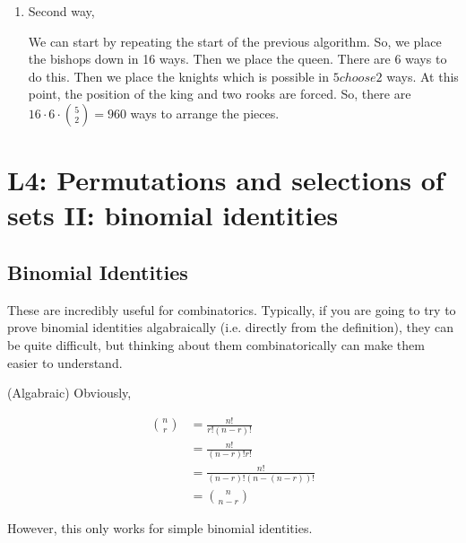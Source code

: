 \documentclass{report}
\begin{document}
{\begin{enumerate}
         All in all, there are $16\cdot (4 + 6 + 6 + 4)\cdot 3 = 960$. Hence,
         why it is called Chess 960. 
        
        \item Second way, 
        
        We can start by repeating the start of the previous algorithm. So,
        we place the bishops down in 16 ways. Then we place the queen. There are 
        6 ways to do this. Then we place the knights which is possible in $5 choose 2$ ways. 
        At this point, the position of the king and two rooks are forced. So, 
        there are $16\cdot 6\cdot \binom{5}{2} = 960$ ways to arrange the pieces.
    \end{enumerate}

}

\section{L4: Permutations and selections of sets II: binomial identities}

\subsection*{Binomial Identities}

These are incredibly useful for combinatorics. Typically, if you are going to try 
to prove binomial identities algabraically (i.e. directly from the definition), 
they can be quite difficult, but thinking about them combinatorically can make 
them easier to understand. 


\begin{subproof}{(Algabraic)}
    Obviously, 

    \begin{align*}
        \binom{n}{r} &= \frac{n!}{r!(n-r)!} \\
        &= \frac{n!}{(n-r)!r!} \\
        &= \frac{n!}{(n-r)! (n - (n - r))!} \\
        &= \binom{n}{n-r}
    \end{align*}

    However, this only works for simple binomial identities. 
\end{subproof}
\end{document}
